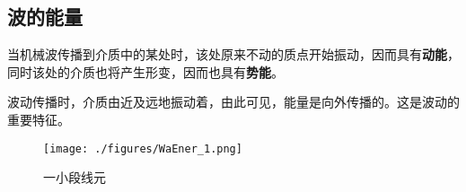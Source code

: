 

\subsection{波的能量}
当机械波传播到介质中的某处时，该处原来不动的质点开始振动，因而具有\textbf{动能}，同时该处的介质也将产生形变，因而也具有\textbf{势能}。

波动传播时，介质由近及远地振动着，由此可见，能量是向外传播的。这是波动的重要特征。

\begin{figure}[ht]
\centering
\texttt{[image: ./figures/WaEner\_1.png]}
\caption{一小段线元} \label{WaEner_fig1}
\end{figure}

